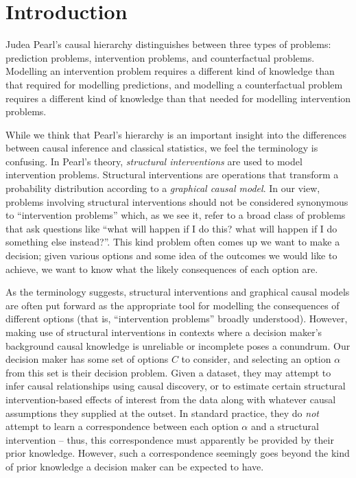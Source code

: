 \documentclass[USenglish,onecolumn]{article}
\begin{document}

 

\maketitle
\section{Introduction}

Judea Pearl's causal hierarchy \citep{pearl_book_2018} distinguishes between three types of problems: prediction problems, intervention problems, and counterfactual problems. Modelling an intervention problem requires a different kind of knowledge than that required for modelling predictions, and modelling a counterfactual problem requires a different kind of knowledge than that needed for modelling intervention problems.

While we think that Pearl's hierarchy is an important insight into the differences between causal inference and classical statistics, we feel the terminology is confusing. In Pearl's theory, \emph{structural interventions} are used to model intervention problems. Structural interventions are operations that transform a probability distribution according to a \emph{graphical causal model}. In our view, problems involving structural interventions should not be considered synonymous to ``intervention problems'' which, as we see it, refer to a broad class of problems that ask questions like ``what will happen if I do this? what will happen if I do something else instead?''. This kind problem often comes up we want to make a decision; given various options and some idea of the outcomes we would like to achieve, we want to know what the likely consequences of each option are.

As the terminology suggests, structural interventions and graphical causal models are often put forward as the appropriate tool for modelling the consequences of different options (that is, ``intervention problems'' broadly understood). However, making use of structural interventions in contexts where a decision maker's background causal knowledge is unreliable or incomplete poses a conundrum. Our decision maker has some set of options $C$ to consider, and selecting an option $\alpha$ from this set is their decision problem. Given a dataset, they may attempt to infer causal relationships using causal discovery, or to estimate certain structural intervention-based effects of interest from the data along with whatever causal assumptions they supplied at the outset. In standard practice, they do \emph{not} attempt to learn a correspondence between each option $\alpha$ and a structural intervention -- thus, this correspondence must apparently be provided by their prior knowledge. However, such a correspondence seemingly goes beyond the kind of prior knowledge a decision maker can be expected to have.
\end{document}
